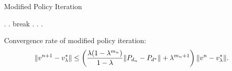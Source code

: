 \documentclass{beamer}
\begin{document}
\begin{frame}[shrink]{Modified Policy Iteration}
    \begin{algorithm}[H]
    \caption{Modified Policy Iteration Algorithm (MPI)}
    \begin{algorithmic}
        .
        .
             {break} \EndIf.
            \EndFor.
        \EndFor.
    \end{algorithmic}
    \end{algorithm}
    Convergence rate of modified policy iteration:
    \[
        \Arrowvert v^{n+1} - v^*_\lambda \Arrowvert \le 
        \left( \frac{\lambda (1 - \lambda^{m_n})}{1- \lambda} \Arrowvert P_{d_n} - P_{d^*} \Arrowvert + \lambda^{m_n + 1} \right) \Arrowvert v^n - v^*_{\lambda} \Arrowvert.
    \]
    
\end{frame}
\end{document}
